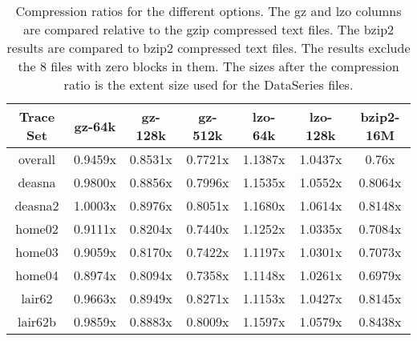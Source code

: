 \begin{table*}[t]
\centering
\begin{tabular}{|c|c|c|c|c|c|c|}\hline
Trace Set & gz-64k  & gz-128k & gz-512k & lzo-64k & lzo-128k & bzip2-16M \\ \hline
overall   & 0.9459x & 0.8531x & 0.7721x & 1.1387x & 1.0437x & 0.76x   \\
deasna    & 0.9800x & 0.8856x & 0.7996x & 1.1535x & 1.0552x & 0.8064x \\
deasna2   & 1.0003x & 0.8976x & 0.8051x & 1.1680x & 1.0614x & 0.8148x \\
home02    & 0.9111x & 0.8204x & 0.7440x & 1.1252x & 1.0335x & 0.7084x \\
home03    & 0.9059x & 0.8170x & 0.7422x & 1.1197x & 1.0301x & 0.7073x \\
home04    & 0.8974x & 0.8094x & 0.7358x & 1.1148x & 1.0261x & 0.6979x \\
lair62    & 0.9663x & 0.8949x & 0.8271x & 1.1153x & 1.0427x & 0.8145x \\
lair62b   & 0.9859x & 0.8883x & 0.8009x & 1.1597x & 1.0579x & 0.8438x \\
\hline
\end{tabular}

\caption{Compression ratios for the different options.  The gz and lzo
columns are compared relative to the gzip compressed text files.  The
bzip2 results are compared to bzip2 compressed text files.  The
results exclude the 8 files with zero blocks in them.  The sizes after
the compression ratio is the extent size used for the DataSeries files.}

\label{table:ellard:compression}
\end{table*}
